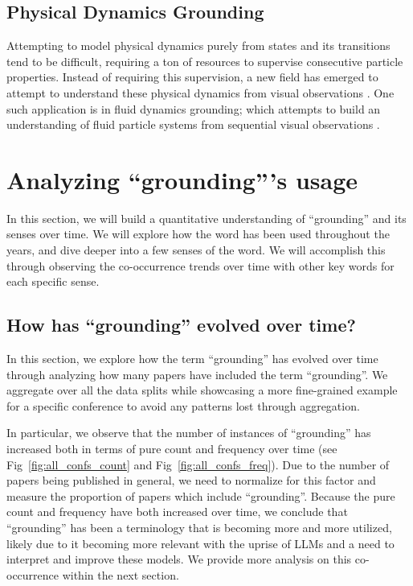 \documentclass[11pt]{article}
\begin{document}
\subsection{Physical Dynamics Grounding}
Attempting to model physical dynamics purely from states and its transitions tend to be difficult, requiring a ton of resources to supervise consecutive particle properties. Instead of requiring this supervision, a new field has emerged to attempt to understand these physical dynamics from visual observations \cite{NEURIPS2024_neuma_material_visual_grounding}. One such application is in fluid dynamics grounding; which attempts to build an understanding of fluid particle systems from sequential visual observations \cite{guan2022neurofluidfluiddynamicsgrounding}. 

\section{Analyzing ``grounding'''s usage}
In this section, we will build a quantitative understanding of ``grounding'' and its senses over time. We will explore how the word has been used throughout the years, and dive deeper into a few senses of the word. We will accomplish this through observing the co-occurrence trends over time with other key words for each specific sense.

\subsection{How has ``grounding'' evolved over time?}
In this section, we explore how the term ``grounding'' has evolved over time through analyzing how many papers have included the term ``grounding''. We aggregate over all the data splits while showcasing a more fine-grained example for a specific conference to avoid any patterns lost through aggregation.

In particular, we observe that the number of instances of ``grounding'' has increased both in terms of pure count and frequency over time (see Fig~\ref{fig:all_confs_count} and Fig~\ref{fig:all_confs_freq}). Due to the number of papers being published in general, we need to normalize for this factor and measure the proportion of papers which include ``grounding''. Because the pure count and frequency have both increased over time, we conclude that ``grounding'' has been a terminology that is becoming more and more utilized, likely due to it becoming more relevant with the uprise of LLMs and a need to interpret and improve these models. We provide more analysis on this co-occurrence within the next section.
\end{document}
